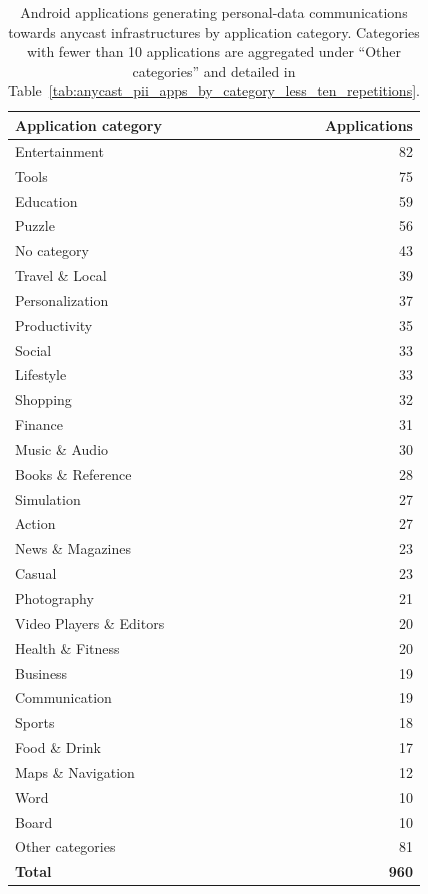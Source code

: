 \documentclass[
A4paper,                %
twoside,                %
openright,              %
chapterprefix=true,     %
12pt,                   %
headings=normal,        %
titlepage=on            %
]{book}
\begin{document}
\begin{table}[ht]
    \centering
    \small
    \caption{Android applications generating personal-data communications towards anycast infrastructures by application category. Categories with fewer than 10 applications are aggregated under ``Other categories'' and detailed in Table~\ref{tab:anycast_pii_apps_by_category_less_ten_repetitions}.}
    \label{tab:anycast_pii_apps_by_category}
    \begin{tabular}{lr}
        \toprule
        \textbf{Application category} & \textbf{Applications} \\
        \midrule
        Entertainment & 82 \\
        Tools & 75 \\
        Education & 59 \\
        Puzzle & 56 \\
        No category & 43 \\
        Travel \& Local & 39 \\
        Personalization & 37 \\
        Productivity & 35 \\
        Social & 33 \\
        Lifestyle & 33 \\
        Shopping & 32 \\
        Finance & 31 \\
        Music \& Audio & 30 \\
        Books \& Reference & 28 \\
        Simulation & 27 \\
        Action & 27 \\
        News \& Magazines & 23 \\
        Casual & 23 \\
        Photography & 21 \\
        Video Players \& Editors & 20 \\
        Health \& Fitness & 20 \\
        Business & 19 \\
        Communication & 19 \\
        Sports & 18 \\
        Food \& Drink & 17 \\
        Maps \& Navigation & 12 \\
        Word & 10 \\
        Board & 10 \\
        Other categories & 81 \\
        \midrule
        \textbf{Total} & \textbf{960} \\
        \bottomrule
    \end{tabular}
\end{table}
\end{document}
